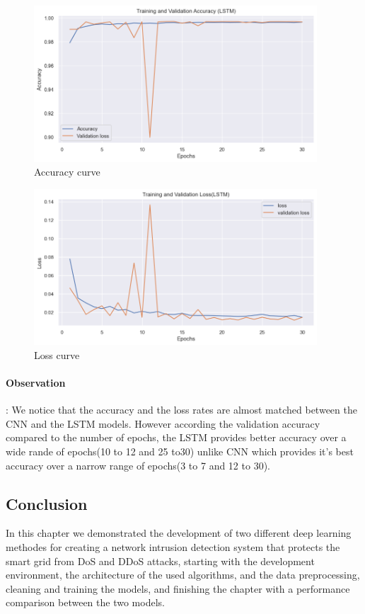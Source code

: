 		\begin{figure}[h]
			\centering
			\includegraphics[width=400px]{figures/LSTM_training_validation.png}
			\caption{Accuracy curve}
			\label{fig:aa}
		\end{figure}
\newpage
		\begin{figure}[h]
			\centering
			\includegraphics[width=400px]{figures/LSTM_training_validation_loss.png}
			\caption{ Loss curve}
			\label{fig:ff}
		\end{figure}
		





\paragraph{Observation}: We notice that the accuracy and the loss rates are almost matched between the CNN and the LSTM models. However according the validation accuracy compared to the number of epochs, the LSTM provides better accuracy over a wide rande of epochs(10 to 12 and 25 to30) unlike CNN which provides it's best accuracy over a narrow range of epochs(3 to 7 and 12 to 30).

		







\subsection{Conclusion}
In this chapter we demonstrated the development of two different deep learning methodes for creating a network intrusion detection system that protects the smart grid from DoS and DDoS attacks, starting with the development environment, the architecture of the used algorithms, and the data preprocessing, cleaning and training the models, and finishing the chapter with a performance comparison between the two models.





\newpage












